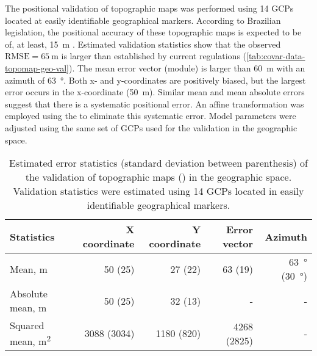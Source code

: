 The positional validation of topographic maps was performed using \num{14} GCPs located at easily 
identifiable geographical markers. According to Brazilian legislation, the positional accuracy of 
these topographic maps is expected to be of, at least, \SI{15}{\metre} \cite{Brasil1984}. Estimated 
validation statistics show that the observed $\text{RMSE} = \SI{65}{\m}$ is larger than 
established by current regulations (\autoref{tab:covar-data-topomap-geo-val}). The mean error 
vector (module) is larger than \SI{60}{\metre} with an azimuth of \SI{63}{\degree}. Both x- and 
y-coordinates are positively biased, but the largest error occurs in the x-coordinate 
(\SI{50}{\metre}). Similar mean and mean absolute errors suggest that there is a systematic 
positional error. An affine transformation was employed using the  
\cite{Carrillo2012} to eliminate this systematic error. Model parameters were adjusted using the 
same set of GCPs used for the validation in the geographic space.

\begin{table}[ht]
 \caption{Estimated error statistics (standard deviation between parenthesis) of the validation of 
 topographic maps () in the geographic space. Validation statistics were 
 estimated using \num{14} GCPs located in easily identifiable geographical markers.}
 \label{tab:tab:covar-data-topomap-geo-val}
 \centering
 {\small
 \begin{tabular}{lrrrr}
  \hline
  Statistics & X coordinate & Y coordinate & Error vector & Azimuth \\
  \hline
  Mean, \si{\metre} & 50 (25) & 27 (22) & 63 (19) & \SI{63}{\degree} (\SI{30}{\degree}) \\ 
  Absolute mean, \si{\metre} & 50 (25) & 32 (13) & - & - \\ 
  Squared mean, \si{\metre\squared} & 3088 (3034) & 1180 (820) & 4268 (2825) & - \\ 
  \hline
 \end{tabular}}
\end{table}


